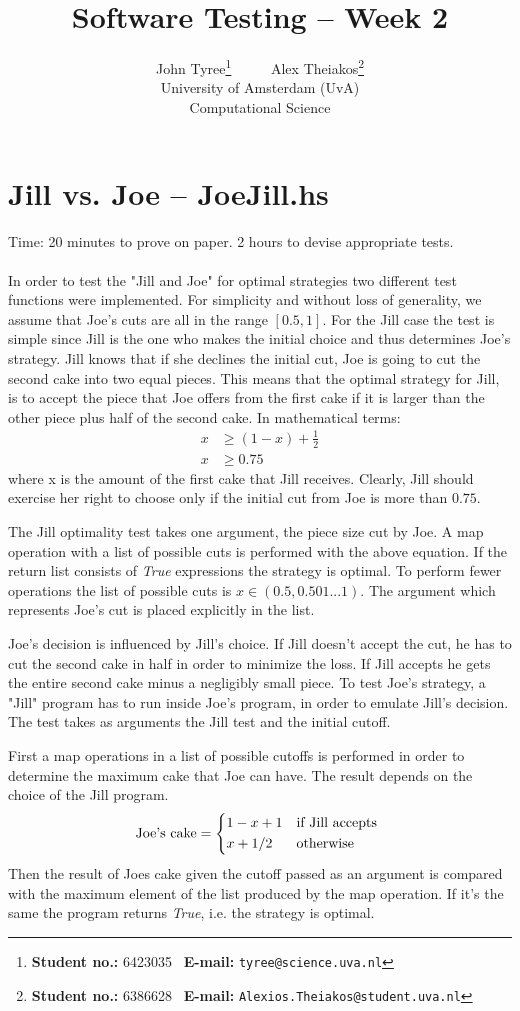 \documentclass[11pt,a4paper]{article}
\title{\large \textbf{Software Testing} \--- Week 2}
\author{John Tyree\footnote{\textbf{Student no.:} 6423035 \textbar\ \textbf{E-mail:} \texttt{tyree@science.uva.nl}} \ \ \ \ \ Alex Theiakos\footnote{\textbf{Student no.:} 6386628 \textbar\ \textbf{E-mail:} \texttt{Alexios.Theiakos@student.uva.nl}} \\[15pt] University of Amsterdam (UvA) \\ Computational Science}
\date{}
\numberwithin{equation}{section}%
\begin{document}
\maketitle

\section{Jill vs. Joe \--- JoeJill.hs}
Time: 20 minutes to prove on paper. 2 hours to devise appropriate tests. \\ \\
In order to test the "Jill and Joe" for optimal strategies two different test functions were implemented. For simplicity and without loss of generality, we assume that Joe's cuts are all in the range $[0.5, 1]$.
For the Jill case the test is simple since Jill is the one who makes the initial choice and thus determines Joe's strategy. Jill knows that if she declines the initial cut, Joe is going to cut the second cake into two equal pieces.
This means that the optimal strategy for Jill, is to accept the piece that Joe offers from the first cake if it is larger than the other piece plus half of the second cake. In mathematical terms:
\begin{align*}
    x &\geq (1 - x) + \frac{1}{2} \\
    x &\geq 0.75
\end{align*}
where x is the amount of the first cake that Jill receives.
Clearly, Jill should exercise her right to choose only if the initial cut from Joe is more than $0.75$.

The Jill optimality test takes one argument, the piece size cut by Joe. A map operation with a list of possible cuts is performed with the above equation. If the return list consists of \emph{True} expressions the strategy is optimal. To perform fewer operations the list of possible cuts is $x\in (0.5,0.501...1)$. The argument which represents Joe's cut is placed explicitly in the list.

Joe's decision is influenced by Jill's choice. If Jill doesn't accept the cut, he has to cut the second cake in half in order to minimize the loss. If Jill accepts he gets the entire second cake minus a negligibly small piece.
To test Joe's strategy, a "Jill" program has to run inside Joe's program, in order to emulate Jill's decision. The test takes as arguments the Jill test and the initial cutoff. 

First a map operations in a list of possible cutoffs is performed in order to determine the maximum cake that Joe can have. The result depends on the choice of the Jill program.
\[
    \text{Joe's cake} =
    \begin{dcases*}
        1 - x + 1 & if Jill accepts \\
        x + 1/2 & otherwise
    \end{dcases*}
\]
Then the result of Joes cake given the cutoff passed as an argument is compared with the maximum element of the list produced by the map operation. If it's the same the program returns \emph{True}, i.e. the strategy is optimal.
\end{document}
